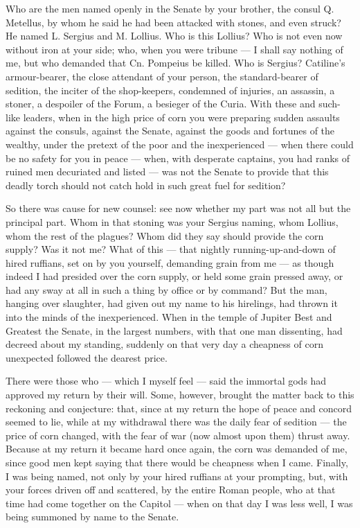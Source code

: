  Who are the men named openly in the Senate by your brother, the consul Q. Metellus, by whom he said he had been attacked with stones, and even struck? He named L. Sergius and M. Lollius. Who is this Lollius? Who is not even now without iron at your side; who, when you were tribune --- I shall say nothing of me, but who demanded that Cn. Pompeius be killed. Who is Sergius? Catiline's armour-bearer, the close attendant of your person, the standard-bearer of sedition, the inciter of the shop-keepers, condemned of injuries, an assassin, a stoner, a despoiler of the Forum, a besieger of the Curia. With these and such-like leaders, when in the high price of corn you were preparing sudden assaults against the consuls, against the Senate, against the goods and fortunes of the wealthy, under the pretext of the poor and the inexperienced --- when there could be no safety for you in peace --- when, with desperate captains, you had ranks of ruined men decuriated and listed --- was not the Senate to provide that this deadly torch should not catch hold in such great fuel for sedition?

 So there was cause for new counsel: see now whether my part was not all but the principal part. Whom in that stoning was your Sergius naming, whom Lollius, whom the rest of the plagues? Whom did they say should provide the corn supply? Was it not me? What of this --- that nightly running-up-and-down of hired ruffians, set on by you yourself, demanding grain from me --- as though indeed I had presided over the corn supply, or held some grain pressed away, or had any sway at all in such a thing by office or by command? But the man, hanging over slaughter, had given out my name to his hirelings, had thrown it into the minds of the inexperienced. When in the temple of Jupiter Best and Greatest the Senate, in the largest numbers, with that one man dissenting, had decreed about my standing, suddenly on that very day a cheapness of corn unexpected followed the dearest price.

 There were those who --- which I myself feel --- said the immortal gods had approved my return by their will. Some, however, brought the matter back to this reckoning and conjecture: that, since at my return the hope of peace and concord seemed to lie, while at my withdrawal there was the daily fear of sedition --- the price of corn changed, with the fear of war (now almost upon them) thrust away. Because at my return it became hard once again, the corn was demanded of me, since good men kept saying that there would be cheapness when I came. Finally, I was being named, not only by your hired ruffians at your prompting, but, with your forces driven off and scattered, by the entire Roman people, who at that time had come together on the Capitol --- when on that day I was less well, I was being summoned by name to the Senate.

